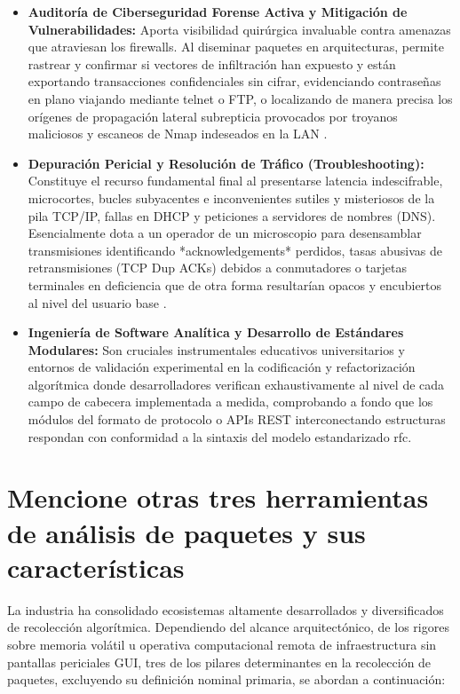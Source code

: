 \documentclass[a4paper,12pt]{article}
\begin{document}
\begin{itemize}
    \item \textbf{Auditoría de Ciberseguridad Forense Activa y Mitigación de Vulnerabilidades:} Aporta visibilidad quirúrgica invaluable contra amenazas que atraviesan los firewalls. Al diseminar paquetes en arquitecturas, permite rastrear y confirmar si vectores de infiltración han expuesto y están exportando transacciones confidenciales sin cifrar, evidenciando contraseñas en plano viajando mediante telnet o FTP, o localizando de manera precisa los orígenes de propagación lateral subrepticia provocados por troyanos maliciosos y escaneos de Nmap indeseados en la LAN \cite{stallings2014}. 
    \item \textbf{Depuración Pericial y Resolución de Tráfico (Troubleshooting):} Constituye el recurso fundamental final al presentarse latencia indescifrable, microcortes, bucles subyacentes e inconvenientes sutiles y misteriosos de la pila TCP/IP, fallas en DHCP y peticiones a servidores de nombres (DNS). Esencialmente dota a un operador de un microscopio para desensamblar transmisiones identificando *acknowledgements* perdidos, tasas abusivas de retransmisiones (TCP Dup ACKs) debidos a conmutadores o tarjetas terminales en deficiencia que de otra forma resultarían opacos y encubiertos al nivel del usuario base \cite{kurose2017}.
    \item \textbf{Ingeniería de Software Analítica y Desarrollo de Estándares Modulares:} Son cruciales instrumentales educativos universitarios y entornos de validación experimental en la codificación y refactorización algorítmica donde desarrolladores verifican exhaustivamente al nivel de cada campo de cabecera implementada a medida, comprobando a fondo que los módulos del formato de protocolo o APIs REST interconectando estructuras respondan con conformidad a la sintaxis del modelo estandarizado rfc.
\end{itemize}



\section{Mencione otras tres herramientas de análisis de paquetes y sus características}

La industria ha consolidado ecosistemas altamente desarrollados y diversificados de recolección algorítmica. Dependiendo del alcance arquitectónico, de los rigores sobre memoria volátil u operativa computacional remota de infraestructura sin pantallas periciales GUI, tres de los pilares determinantes en la recolección de paquetes, excluyendo su definición nominal primaria, se abordan a continuación:
\end{document}
